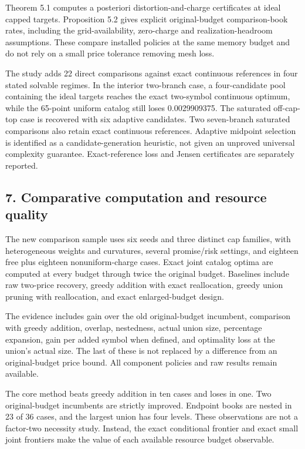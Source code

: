 \documentclass[11pt,letterpaper]{article}
\begin{document}
Theorem 5.1 computes a posteriori distortion-and-charge certificates at ideal capped targets. Proposition 5.2 gives explicit original-budget comparison-book rates, including the grid-availability, zero-charge and realization-headroom assumptions. These compare installed policies at the same memory budget and do not rely on a small price tolerance removing mesh loss.



The study adds 22 direct comparisons against exact continuous references in four stated solvable regimes. In the interior two-branch case, a four-candidate pool containing the ideal targets reaches the exact two-symbol continuous optimum, while the 65-point uniform catalog still loses 0.0029909375. The saturated off-cap-top case is recovered with six adaptive candidates. Two seven-branch saturated comparisons also retain exact continuous references. Adaptive midpoint selection is identified as a candidate-generation heuristic, not given an unproved universal complexity guarantee. Exact-reference loss and Jensen certificates are separately reported.



\subsection*{7. Comparative computation and resource quality}


The new comparison sample uses six seeds and three distinct cap families, with heterogeneous weights and curvatures, several promise/risk settings, and eighteen free plus eighteen nonuniform-charge cases. Exact joint catalog optima are computed at every budget through twice the original budget. Baselines include raw two-price recovery, greedy addition with exact reallocation, greedy union pruning with reallocation, and exact enlarged-budget design.



The evidence includes gain over the old original-budget incumbent, comparison with greedy addition, overlap, nestedness, actual union size, percentage expansion, gain per added symbol when defined, and optimality loss at the union's actual size. The last of these is not replaced by a difference from an original-budget price bound. All component policies and raw results remain available.



The core method beats greedy addition in ten cases and loses in one. Two original-budget incumbents are strictly improved. Endpoint books are nested in 23 of 36 cases, and the largest union has four levels. These observations are not a factor-two necessity study. Instead, the exact conditional frontier and exact small joint frontiers make the value of each available resource budget observable.
\end{document}
